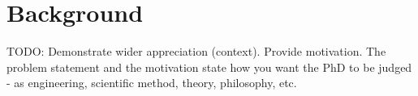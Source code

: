 \chapter{Background}
\label{chap:background}

TODO: Demonstrate wider appreciation (context). Provide motivation. The problem statement and the motivation state how you want the PhD to be judged - as engineering, scientific method, theory, philosophy, etc.